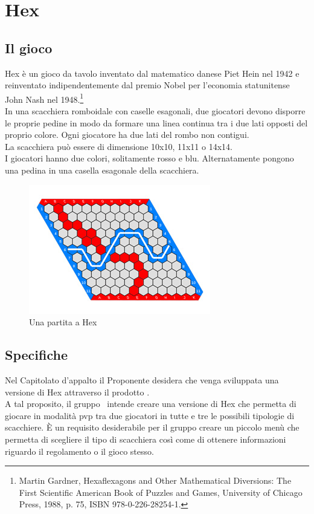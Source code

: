 \documentclass[../AnalisiDeiRequisiti.tex]{subfiles}
\begin{document}
	\section{Hex}
		\subsection{Il gioco}
			Hex è un gioco da tavolo inventato dal matematico danese Piet Hein nel 1942 e reinventato
			indipendentemente dal premio Nobel per l'economia statunitense John Nash nel
			1948.\footnote[1]{Martin Gardner, Hexaflexagons and Other Mathematical Diversions: The First
			Scientific American Book of Puzzles and Games, University of Chicago Press, 1988, p. 75,
			ISBN 978-0-226-28254-1.}\\
			In una scacchiera romboidale con caselle esagonali, due giocatori devono disporre le proprie
			pedine in modo da formare una linea continua tra i due lati opposti del proprio colore.
			Ogni giocatore ha due lati del rombo non contigui.\\
			La scacchiera può essere di dimensione 10x10, 11x11 o 14x14.\\
			I giocatori hanno due colori, solitamente rosso e blu. Alternatamente pongono una pedina in
			una casella esagonale della scacchiera.
			\begin{figure} [h!]
				\centering
				\includegraphics{./Figures/HexBoard.jpg}
				\caption{Una partita a Hex}\label{fig:1}
			\end{figure}
		\subsection{Specifiche}
			Nel Capitolato d'appalto il Proponente desidera che venga sviluppata una versione di Hex
			attraverso il prodotto \progetto.\\
			A tal proposito, il gruppo \kaleidoscode\ intende creare una versione di Hex che permetta
			di giocare in modalità pvp tra due giocatori in tutte e tre le possibili tipologie di
			scacchiere. È un requisito desiderabile per il gruppo creare un piccolo menù che permetta
			di scegliere il tipo di scacchiera così come di ottenere informazioni riguardo il
			regolamento o il gioco stesso.
\end{document}
